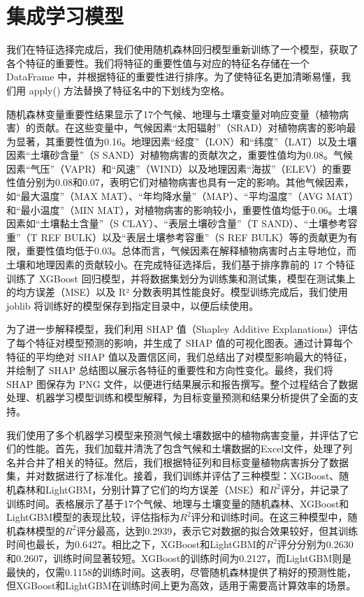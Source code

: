 \documentclass[AutoFakeBold]{LZUThesis-PgD&PhD}
\begin{document}
	
	\section{集成学习模型}
	我们在特征选择完成后，我们使用随机森林回归模型重新训练了一个模型，获取了各个特征的重要性。我们将特征的重要性值与对应的特征名存储在一个 DataFrame 中，并根据特征的重要性进行排序。为了使特征名更加清晰易懂，我们用 apply() 方法替换了特征名中的下划线为空格。
	
	随机森林变量重要性结果显示了17个气候、地理与土壤变量对响应变量（植物病害）的贡献。在这些变量中，气候因素“太阳辐射”（SRAD）对植物病害的影响最为显著，其重要性值为0.16。地理因素“经度”（LON）和“纬度”（LAT）以及土壤因素“土壤砂含量”（S SAND）对植物病害的贡献次之，重要性值均为0.08。气候因素“气压”（VAPR）和“风速”（WIND）以及地理因素“海拔”（ELEV）的重要性值分别为0.08和0.07，表明它们对植物病害也具有一定的影响。其他气候因素，如“最大温度”（MAX MAT）、“年均降水量”（MAP）、“平均温度”（AVG MAT）和“最小温度”（MIN MAT），对植物病害的影响较小，重要性值均低于0.06。土壤因素如“土壤黏土含量”（S CLAY）、“表层土壤砂含量”（T SAND）、“土壤参考容重”（T REF BULK）以及“表层土壤参考容重”（S REF BULK）等的贡献更为有限，重要性值均低于0.03。总体而言，气候因素在解释植物病害时占主导地位，而土壤和地理因素的贡献较小。在完成特征选择后，我们基于排序靠前的 17 个特征训练了 XGBoost 回归模型，并将数据集划分为训练集和测试集，模型在测试集上的均方误差（MSE）以及 R² 分数表明其性能良好。模型训练完成后，我们使用 joblib 将训练好的模型保存到指定目录中，以便后续使用。
	
	为了进一步解释模型，我们利用 SHAP 值（Shapley Additive Explanations）评估了每个特征对模型预测的影响，并生成了 SHAP 值的可视化图表。通过计算每个特征的平均绝对 SHAP 值以及置信区间，我们总结出了对模型影响最大的特征，并绘制了 SHAP 总结图以展示各特征的重要性和方向性变化。最终，我们将 SHAP 图保存为 PNG 文件，以便进行结果展示和报告撰写。整个过程结合了数据处理、机器学习模型训练和模型解释，为目标变量预测和结果分析提供了全面的支持。
	
	
	我们使用了多个机器学习模型来预测气候土壤数据中的植物病害变量，并评估了它们的性能。首先，我们加载并清洗了包含气候和土壤数据的Excel文件，处理了列名并合并了相关的特征。然后，我们根据特征列和目标变量植物病害拆分了数据集，并对数据进行了标准化。接着，我们训练并评估了三种模型：XGBoost、随机森林和LightGBM，分别计算了它们的均方误差（MSE）和$R^2$评分，并记录了训练时间。表格展示了基于17个气候、地理与土壤变量的随机森林、XGBoost和LightGBM模型的表现比较，评估指标为$R^2$评分和训练时间。在这三种模型中，随机森林模型的$R^2$评分最高，达到0.2939，表示它对数据的拟合效果较好，但其训练时间也最长，为0.6427。相比之下，XGBoost和LightGBM的$R^2$评分分别为0.2630和0.2607，训练时间显著较短。XGBoost的训练时间为0.2127，而LightGBM则是最快的，仅需0.1158的训练时间。这表明，尽管随机森林提供了稍好的预测性能，但XGBoost和LightGBM在训练时间上更为高效，适用于需要高计算效率的场景。
	
\end{document}
